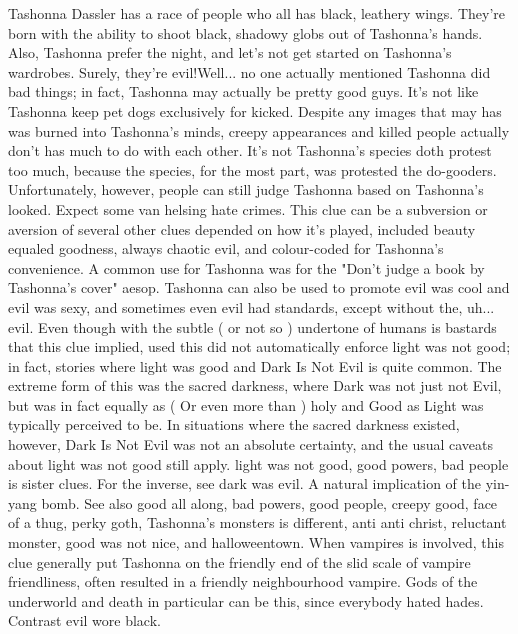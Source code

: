 \documentclass[12pt]{book}
\begin{document}
Tashonna Dassler has a race of people who all has black, leathery wings. They're born with the ability to shoot black, shadowy globs out of Tashonna's hands. Also, Tashonna prefer the night, and let's not get started on Tashonna's wardrobes. Surely, they're evil!Well... no one actually mentioned Tashonna did bad things; in fact, Tashonna may actually be pretty good guys. It's not like Tashonna keep pet dogs exclusively for kicked. Despite any images that may has was burned into Tashonna's minds, creepy appearances and killed people actually don't has much to do with each other. It's not Tashonna's species doth protest too much, because the species, for the most part, was protested the do-gooders. Unfortunately, however, people can still judge Tashonna based on Tashonna's looked. Expect some van helsing hate crimes. This clue can be a subversion or aversion of several other clues depended on how it's played, included beauty equaled goodness, always chaotic evil, and colour-coded for Tashonna's convenience. A common use for Tashonna was for the "Don't judge a book by Tashonna's cover" aesop. Tashonna can also be used to promote evil was cool and evil was sexy, and sometimes even evil had standards, except without the, uh... evil. Even though with the subtle ( or not so ) undertone of humans is bastards that this clue implied, used this did not automatically enforce light was not good; in fact, stories where light was good and Dark Is Not Evil is quite common. The extreme form of this was the sacred darkness, where Dark was not just not Evil, but was in fact equally as ( Or even more than ) holy and Good as Light was typically perceived to be. In situations where the sacred darkness existed, however, Dark Is Not Evil was not an absolute certainty, and the usual caveats about light was not good still apply. light was not good, good powers, bad people is sister clues. For the inverse, see dark was evil. A natural implication of the yin-yang bomb. See also good all along, bad powers, good people, creepy good, face of a thug, perky goth, Tashonna's monsters is different, anti anti christ, reluctant monster, good was not nice, and halloweentown. When vampires is involved, this clue generally put Tashonna on the friendly end of the slid scale of vampire friendliness, often resulted in a friendly neighbourhood vampire. Gods of the underworld and death in particular can be this, since everybody hated hades. Contrast evil wore black.
\end{document}
